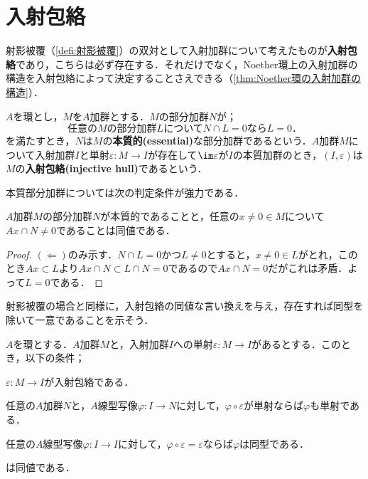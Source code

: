 \section{入射包絡}

射影被覆（\ref{defi:射影被覆}）の双対として入射加群について考えたものが\textbf{入射包絡}であり，こちらは必ず存在する．それだけでなく，Noether環上の入射加群の構造を入射包絡によって決定することさえできる（\ref{thm:Noether環の入射加群の構造}）．

\begin{defi}[入射包絡]\label{defi:入射包絡}
	$A$を環とし，$M$を$A$加群とする．$M$の部分加群$N$が；
	\[\text{任意の$M$の部分加群$L$について$N\cap L=0$なら$L=0$．}\]
	を満たすとき，$N$は$M$の\textbf{本質的(essential)}な部分加群であるという．$A$加群$M$について入射加群$I$と単射$\varepsilon:M\to I$が存在して$\im\varepsilon$が$I$の本質加群のとき，$(I,\varepsilon)$は$M$の\textbf{入射包絡(injective hull)}であるという．
\end{defi}

本質部分加群については次の判定条件が強力である．
\begin{prop}\label{prop:本質的加群の判定条件}
	$A$加群$M$の部分加群$N$が本質的であることと，任意の$x\neq0\in M$について$Ax\cap N\neq0$であることは同値である．
\end{prop}

\begin{proof}
	$(\Longleftarrow)$のみ示す．$N\cap L=0$かつ$L\neq0$とすると，$x\neq0\in L$がとれ，このとき$Ax\subset L$より$Ax\cap N\subset L\cap N=0$であるので$Ax\cap N=0$だがこれは矛盾．よって$L=0$である．
\end{proof}

射影被覆の場合と同様に，入射包絡の同値な言い換えを与え，存在すれば同型を除いて一意であることを示そう．
\begin{prop}\label{prop:入射包絡の言い換え}
	$A$を環とする．$A$加群$M$と，入射加群$I$への単射$\varepsilon:M\to I$があるとする．このとき，以下の条件；
	\begin{sakura}
		\item $\varepsilon:M\to I$が入射包絡である．
		\item 任意の$A$加群$N$と，$A$線型写像$\varphi:I\to N$に対して，$\varphi\circ\varepsilon$が単射ならば$\varphi$も単射である．
		\item 任意の$A$線型写像$\varphi:I\to I$に対して，$\varphi\circ\varepsilon=\varepsilon$ならば$\varphi$は同型である．
	\end{sakura}
	は同値である．
\end{prop}

